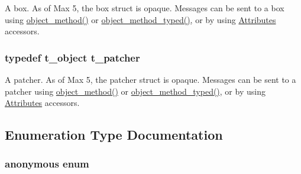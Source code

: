 A box. As of Max 5, the box struct is opaque. Messages can be sent to a box using \hyperlink{group__obj_gae740749094827ac5adc2b7145db1c596}{object\_\-method()} or \hyperlink{group__obj_ga443dee482af22e0fe83e68955d367226}{object\_\-method\_\-typed()}, or by using \hyperlink{group__attr}{Attributes} accessors. \hypertarget{group__patcher_ga17444ce85b4edde6ecc818081ffa1cfd}{
\subsubsection[{t\_\-patcher}]{\setlength{\rightskip}{0pt plus 5cm}typedef {\bf t\_\-object} {\bf t\_\-patcher}}}
\label{group__patcher_ga17444ce85b4edde6ecc818081ffa1cfd}


A patcher. As of Max 5, the patcher struct is opaque. Messages can be sent to a patcher using \hyperlink{group__obj_gae740749094827ac5adc2b7145db1c596}{object\_\-method()} or \hyperlink{group__obj_ga443dee482af22e0fe83e68955d367226}{object\_\-method\_\-typed()}, or by using \hyperlink{group__attr}{Attributes} accessors. 

\subsection{Enumeration Type Documentation}
\hypertarget{group__patcher_gabc6126af1d45847bc59afa0aa3216b04}{
\subsubsection[{"@3}]{\setlength{\rightskip}{0pt plus 5cm}anonymous enum}}
\label{group__patcher_gabc6126af1d45847bc59afa0aa3216b04}


